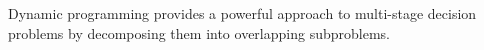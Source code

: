Dynamic programming provides a powerful approach to multi-stage decision problems by decomposing them into overlapping subproblems. 
